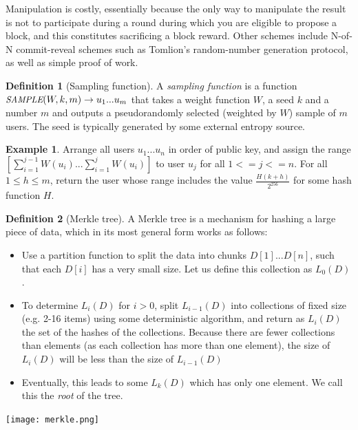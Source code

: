 \documentclass[11pt,a4paper]{article}
\makeatletter
\theoremstyle{plain}
\theoremstyle{definition}
\newtheorem{defn}{Definition}[section]
\newtheorem{exmp}{Example}[section]
\theoremstyle{remark}
\newcommand{\eg}{e.g.\@\xspace}
\newcommand{\makeintoafunction}[1]{\textit{\uppercase{\small #1}}}
\newcommand{\SAMPLE}{\makeintoafunction{sample}}
\makeatother
\begin{document}
Manipulation is costly, essentially because the only way to manipulate the result is not to participate during a round during which you are eligible to propose a block, and this constitutes sacrificing a block reward. Other schemes include N-of-N commit-reveal schemes such as Tomlion's random-number generation protocol\cite{tomlion}, as well as simple proof of work.

\begin{defn}[Sampling function]
A \emph{sampling function} is a function $\SAMPLE(W, k, m) \rightarrow {u_1 ... u_m}$ that takes a weight function $W$, a seed $k$ and a number $m$ and outputs a pseudorandomly selected (weighted by $W$) sample of $m$ users. The seed is typically generated by some external entropy source.
\end{defn}

\begin{exmp}
Arrange all users $u_1 ... u_n$ in order of public key, and assign the range $[\sum_{i=1}^{j-1} W(u_i)...\sum_{i=1}^j W(u_i)]$ to user $u_j$ for all $1 <= j <= n$. For all $1 \le h \le m$, return the user whose range includes the value $\frac{H(k + h)}{2^{256}}$ for some hash function $H$.
\end{exmp}

\begin{defn}[Merkle tree]
A Merkle tree\cite{merkle} is a mechanism for hashing a large piece of data, which in its most general form works as follows:
\begin{itemize}
\item
Use a partition function to split the data into chunks $D[1] ... D[n]$, such that each $D[i]$ has a very small size. Let us define this collection as $L_0(D)$.
\item
To determine $L_i(D)$ for $i > 0$, split $L_{i-1}(D)$ into collections of fixed size (\eg 2-16 items) using some deterministic algorithm, and return as $L_i(D)$ the set of the hashes of the collections. Because there are fewer collections than elements (as each collection has more than one element), the size of $L_i(D)$ will be less than the size of $L_{i-1}(D)$
\item
Eventually, this leads to some $L_k(D)$ which has only one element. We call this the \emph{root} of the tree.
\end{itemize}
\end{defn}

\begin{center}
\texttt{[image: merkle.png]}
\end{center}
\end{document}
